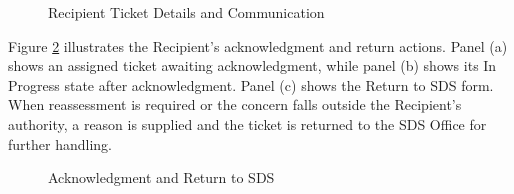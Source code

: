 \renewcommand{\thefigure}{5.16}
\begin{figure}[htbp]
    \centering
    \begin{minipage}[t]{0.43\linewidth}
        \centering
        \vspace{0pt}
        \par{}\par
    \end{minipage}\hspace{0.04\linewidth}
    \begin{minipage}[t]{0.43\linewidth}
        \centering
        \vspace{0pt}
        \par{}\par
    \end{minipage}
    \caption{Recipient Ticket Details and Communication}
    \label{fig:rthread}
\end{figure}
\FloatBarrier

Figure \ref{fig:handle} illustrates the Recipient's acknowledgment and return actions. Panel (a) shows an assigned ticket awaiting acknowledgment, while panel (b) shows its In Progress state after acknowledgment. Panel (c) shows the Return to SDS form. When reassessment is required or the concern falls outside the Recipient's authority, a reason is supplied and the ticket is returned to the SDS Office for further handling.

\renewcommand{\thefigure}{5.17}
\begin{figure}[htbp]
    \centering
    \begin{minipage}[t]{0.43\linewidth}
        \centering
        \vspace{0pt}
        \par{}\par
    \end{minipage}\hspace{0.04\linewidth}
    \begin{minipage}[t]{0.43\linewidth}
        \centering
        \vspace{0pt}
        \par{}\par
    \end{minipage}
    \caption{Acknowledgment and Return to SDS}
    \label{fig:handle}
\end{figure}
\FloatBarrier

